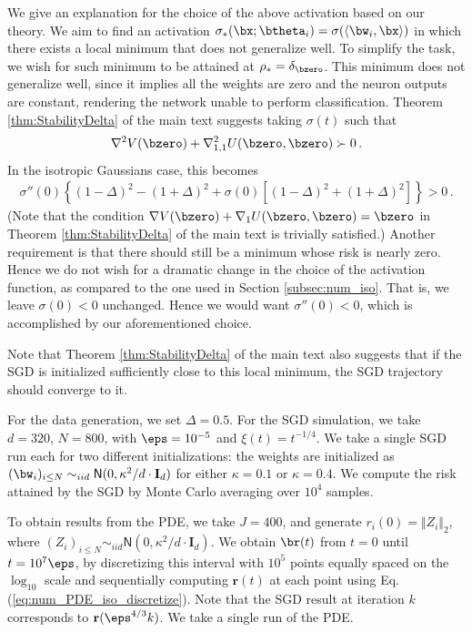 \documentclass[11pt]{article}
\begin{document}
 We give an explanation for the choice of the above activation based on our theory. We aim to find an activation $\sigma_*(\bx;\btheta_i) = \sigma(\langle\bw_i,\bx\rangle)$ in which there exists a local minimum that does not generalize well. To simplify the task, we wish for such minimum to be attained at $\rho_* = \delta_\bzero$. This minimum does not generalize well, since it implies all the weights are zero and the neuron outputs are constant, rendering the network unable to perform classification. Theorem \ref{thm:StabilityDelta} of the main text suggests taking $\sigma(t)$ such that
\begin{align}
\nabla^2V(\bzero) + \nabla^2_{1,1}U(\bzero,\bzero) \succ 0\, .
\end{align}
In the isotropic Gaussians case, this becomes
\begin{align}
\sigma''(0)\left\{ (1-\Delta)^2-(1+\Delta)^2 + \sigma(0)[(1-\Delta)^2+(1+\Delta)^2] \right\} > 0\, .
\end{align}
(Note that the condition $\nabla V(\bzero) + \nabla_{1}U(\bzero,\bzero) = \bzero$ in Theorem \ref{thm:StabilityDelta} of the main text is trivially satisfied.) Another requirement is that there should still be a minimum whose risk is nearly zero. Hence we do not wish for a dramatic change in the choice of the activation function, as compared to the one used in Section \ref{subsec:num_iso}. That is, we leave $\sigma(0)<0$ unchanged. Hence we would want $\sigma''(0)<0$, which is accomplished by our aforementioned choice.

Note that Theorem \ref{thm:StabilityDelta}  of the main text also suggests that if the SGD is initialized sufficiently close to this local minimum, the SGD trajectory should converge to it.

 For the data generation, we set $\Delta=0.5$. For the SGD simulation, we take $d=320$, $N=800$, with $\eps=10^{-5}$ and $\xi(t) = t^{-1/4}$. We take a single SGD run each for two different initializations: the weights are initialized as $(\bw_{i})_{i\leq N}\sim_{iid}\mathsf{N}(0,\kappa^2/d\cdot \mathbf{I}_d)$ for either $\kappa=0.1$ or $\kappa=0.4$. We compute the risk attained by the SGD by Monte Carlo averaging over $10^4$ samples.

To obtain results from the PDE, we take $J=400$, and generate $r_i(0)=\Vert Z_i\Vert_2$, where $(Z_i)_{i\leq N}\sim_{iid}\mathsf{N}(0,\kappa^2/d\cdot \mathbf{I}_d)$. We obtain $\br(t)$ from $t=0$ until $t=10^7\eps$, by discretizing this interval with $10^5$ points equally spaced on the $\log_{10}$ scale and sequentially computing $\mathbf{r}(t)$ at each point using Eq. (\ref{eq:num_PDE_iso_discretize}). Note that the SGD result at iteration $k$ corresponds to $\mathbf{r}(\eps^{4/3} k)$. We take a single run of the PDE.
\end{document}

